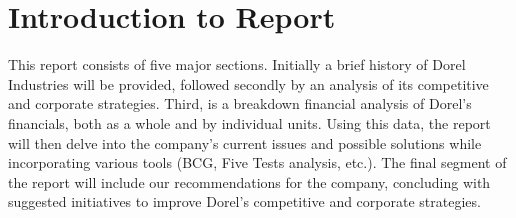 
\begingroup
\let\clearpage\relax
\let\cleardoublepage\relax
\let\cleardoublepage\relax

\chapter*{Introduction to Report}


This report consists of five major sections.  Initially a brief history of Dorel Industries will be provided, followed secondly by an analysis of its competitive and corporate strategies.  Third, is a breakdown financial analysis of Dorel’s financials, both as a whole and by individual units.  Using this data, the report will then delve into the company’s current issues and possible solutions while incorporating various tools (BCG, Five Tests analysis, etc.).  The final segment of the report will include our recommendations for the company, concluding with suggested initiatives to improve Dorel’s competitive and corporate strategies.


\endgroup



